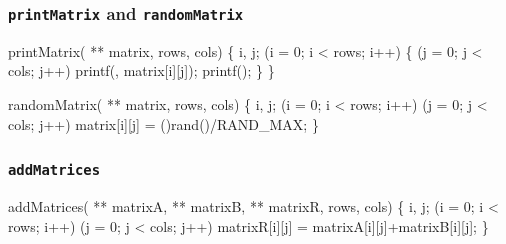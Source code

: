\documentclass[smaller,table]{beamer}
\begin{document}
\begin{frame}[fragile]
\frametitle{{\tt printMatrix} and {\tt randomMatrix}}
\begin{semiverbatim}
\scriptsize
\kr\kl{} printMatrix( ** matrix,  rows,
\kl                                   {} cols)
\kl\{
\kl   {} i, j;
\kl
\kl   {} (i = 0; i < rows; i++)
\kl   \{
\kl      {} (j = 0; j < cols; j++)
\kl         printf(, matrix[i][j]);
\kl      printf();
\kl   \}
\kl\}
\end{semiverbatim}

\begin{semiverbatim}
\scriptsize
\kr\kl{} randomMatrix( ** matrix,  rows,
\kl                                    {} cols)
\kl\{
\kl   {} i, j;
\kl   {} (i = 0; i < rows; i++)
\kl      {} (j = 0; j < cols; j++)
\kl         matrix[i][j] = ()rand()/RAND_MAX;
\kl\}
\end{semiverbatim}
\end{frame}

\begin{frame}[fragile]
\frametitle{{\tt addMatrices}}
\begin{semiverbatim}
\scriptsize
\kr\kl{} addMatrices( ** matrixA,  ** matrixB,
\kl                 {} ** matrixR,
\kl                 {} rows,  cols)
\kl\{
\kl   {} i, j;
\kl   {} (i = 0; i < rows; i++)
\kl      {} (j = 0; j < cols; j++)
\kl         matrixR[i][j] = matrixA[i][j]+matrixB[i][j];
\kl\}
\end{semiverbatim}
\end{frame}
\end{document}
